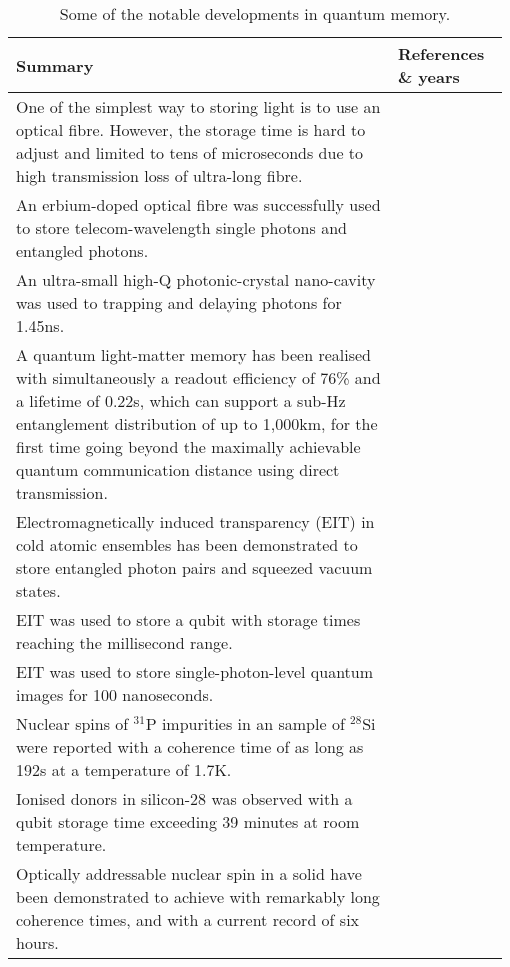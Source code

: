 \begin{table*}[!htbp]
	\begin{tabular}{|p{0.755\linewidth}|p{0.22\linewidth}|}
		\hline
		Summary & References \& years \\
		\hline \hline
		One of the simplest way to storing light is to use an optical fibre. However, the storage time is hard to adjust and limited to tens of microseconds due to high transmission loss of ultra-long fibre.  & \cite{bib:landry2007quantum, bib:lvovsky2009optical} \\
		\hline
		An erbium-doped optical fibre was successfully used to store telecom-wavelength single photons and entangled photons. & \cite{bib:saglamyurek2015quantum, bib:jin2015telecom} \\
		\hline
		An ultra-small high-Q photonic-crystal nano-cavity was used to trapping and delaying photons for 1.45ns. & \cite{bib:tanabe2007trapping} \\
		\hline
		A quantum light-matter memory has been realised with simultaneously a readout efficiency of 76\% and a lifetime of 0.22s, which can support a sub-Hz entanglement distribution of up to 1,000km, for the first time going beyond the maximally achievable quantum communication distance using direct transmission. &  \cite{bib:yang2016efficient}\\
		\hline
		Electromagnetically induced transparency (EIT) in cold atomic ensembles has been demonstrated to store entangled photon pairs and squeezed vacuum states. & \cite{bib:Choi2008mapping, bib:appel2008quantum, bib:honda2008storage} \\
		\hline
		EIT was used to store a qubit with storage times reaching the millisecond range. & \cite{bib:lettner2011remote,  bib:riedl2012bose, bib:xu2013long} \\
		\hline
		EIT was used to store single-photon-level quantum images for 100 nanoseconds. & \cite{bib:ding2013single} \\
		\hline
        Nuclear spins of ${}^{31}$P impurities in an sample of ${}^{28}$Si were reported with a coherence time of as long as 192s at a temperature of 1.7K. & \cite{bib:steger2012quantum} \\
        \hline
        Ionised donors in silicon-28 was observed with a qubit storage time exceeding 39 minutes at room temperature. & \cite{bib:saeedi2013room} \\
        \hline
        Optically addressable nuclear spin in a solid have been demonstrated to achieve with remarkably long coherence times, and with a current record of six hours. & \cite{bib:zhong2015optically} \\
        \hline
	\end{tabular}
	\captionspacetab \caption{Some of the notable developments in quantum memory.} \label{tab:memory}
\end{table*}

